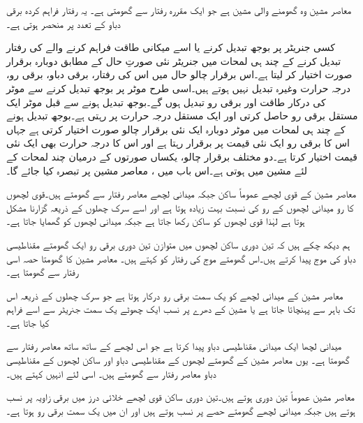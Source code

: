 معاصر مشین وہ گھومنے والی مشین ہے جو ایک مقررہ رفتار سے گھومتی ہے۔ یہ رفتار فراہم کردہ برقی دباو کے تعدد پر منحصر ہوتی ہے۔

کسی جنریٹر پر بوجھ تبدیل کرنے یا اسے میکانی طاقت فراہم کرنے والے کی رفتار تبدیل کرنے کے چند ہی لمحات  میں جنریٹر نئی صورتِ حال کے  مطابق  دوبارہ برقرار  صورت اختیار کر لیتا ہے۔اس برقرار چالو حال میں اس کی رفتار، برقی دباو، برقی رو، درجہ حرارت وغیرہ  تبدیل نہیں ہوتے ہیں۔اسی طرح  موٹر پر بوجھ تبدیل کرنے سے موٹر کی درکار طاقت اور برقی رو تبدیل ہوں گے۔بوجھ تبدیل ہونے سے قبل موٹر  ایک مستقل برقی رو حاصل کرتی  اور ایک مستقل درجہ حرارت  پر رہتی ہے۔بوجھ تبدیل ہونے کے چند ہی لمحات میں موٹر دوبارہ ایک نئی برقرار چالو صورت اختیار کرتی ہے جہاں اس کا برقی رو ایک نئی قیمت پر برقرار رہتا ہے اور اس کا درجہ حرارت بھی ایک نئی قیمت اختیار کرتا ہے۔دو مختلف برقرار چالو، یکساں صورتوں کے درمیان چند لمحات کے لئے مشین  میں ہوتی ہے۔اس باب میں ،  معاصر مشین پر تبصرہ کیا جائے گا۔ 

معاصر مشین کے قوی لچھے عموماً ساکن  جبکہ میدانی لچھے معاصر رفتار سے گھومتے ہیں۔قوی لچھوں کا رو میدانی لچھوں کے  رو کی نسبت بہت زیادہ ہوتا ہے اور اسے  سرک چھلوں کے ذریعہ گزارنا مشکل ہوتا ہے لہٰذا قوی لچھوں کو ساکن رکھا جاتا ہے جبکہ میدانی لچھوں کو گھمایا جاتا ہے۔

 ہم  دیکھ چکے ہیں کہ تین دوری ساکن لچھوں میں  متوازن تین دوری برقی رو  ایک گھومتے مقناطیسی دباو کی موج پیدا کرتے ہیں۔اس گھومتے موج کی رفتار کو   کہتے ہیں۔ معاصر مشین کا گھومتا حصہ اسی رفتار سے گھومتا ہے۔ 

معاصر مشین کے میدانی لچھے کو یک سمت  برقی رو درکار ہوتا ہے جو  سرک چھلوں کے ذریعہ اس تک باہر سے پہنچائا جاتا ہے یا  مشین کے دھرے پر  نسب ایک چھوٹے یک سمت  جنریٹر سے اسے فراہم کیا جاتا ہے۔

میدانی لچھا ایک میدانی مقناطیسی دباو پیدا کرتا ہے جو اس لچھے کے ساتھ ساتھ معاصر رفتار سے گھومتا ہے۔ یوں معاصر مشین کے گھومتے لچھوں کے مقناطیسی دباو  اور ساکن لچھوں کے مقناطیسی دباو معاصر رفتار سے  گھومتے ہیں۔ اسی لئے  انہیں  کہتے ہیں۔

معاصر مشین عموماً تین دوری ہوتے ہیں۔تین دوری ساکن قوی لچھے خلائی درز میں   برقی زاویہ پر نسب ہوتے ہیں جبکہ  میدانی لچھے گھومتے حصے پر نسب ہوتے ہیں اور ان میں یک سمت  برقی رو ہوتا ہے۔ 

